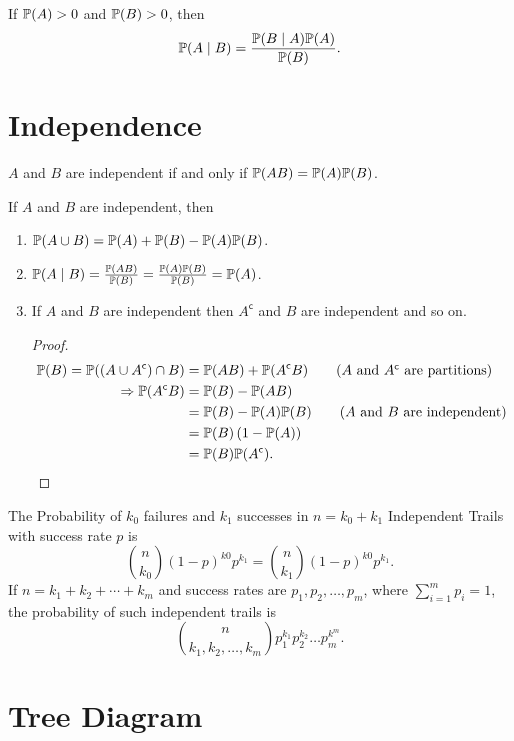 \begin{theorem}
    If $\P{A}>0$ and $\P{B}>0$, then
    \begin{equation*}
        \condP{A}{B} = \frac{\condP{B}{A}\P{A}}{\P{B}}.
    \end{equation*}
\end{theorem}

\section{Independence}
\begin{definition}
    [Independence]
    $A$ and $B$ are independent if and only if $\P{AB}=\P{A}\P{B}$.
\end{definition}

\begin{theorem}
    If $A$ and $B$ are independent, then
    \begin{enumerate}
        \item $\P{A \cup B} = \P{A}+\P{B}-\P{A}\P{B}$.
        \item $\condP{A}{B} = \frac{\P{AB}}{\P{B}}=\frac{\P{A}\P{B}}{\P{B}}=\P{A}$. \label{item:independent}
        \item If $A$ and $B$ are independent then $A^{\mathsf{c}}$ and $B$ are independent and so on.{
            \begin{proof}
                \begin{align*}
                    \P{B} = \P{(A\cup A^{\mathsf{c}})\cap B}
                    &= \P{AB}+\P{A^{\mathsf{c}}B}  \tag{$A$ and $A^\mathsf{c}$ are partitions}\\
                    \Rightarrow \P{A^{\mathsf{c}}B}
                    &= \P{B}-\P{AB} \\
                    &= \P{B}-\P{A}\P{B}  \tag{$A$ and $B$ are independent}\\
                    &= \P{B}\left(1-\P{A}\right) \\
                    &= \P{B}\P{A^{\mathsf{c}}}.
                \end{align*}
            \end{proof}
        }
    \end{enumerate}
\end{theorem}

\begin{theorem}
    The Probability of $k_0$ failures and $k_1$ successes in $n=k_0+k_1$ Independent Trails with success rate $p$ is \[\binom{n}{k_0}(1-p)^{k0}p^{k_1}=\binom{n}{k_1}(1-p)^{k0}p^{k_1}.\]
    If $n=k_1+k_2+\cdots+k_m$ and success rates are $p_1, p_2,\ldots,p_m$, where $\sum_{i=1}^{m}p_i=1$, the probability of such independent trails is
    \[\binom{n}{k_1,k_2,\ldots,k_m}p_1^{k_1}p_2^{k_2}\ldots p_m^{k^m}.\]
\end{theorem}

\section{Tree Diagram}